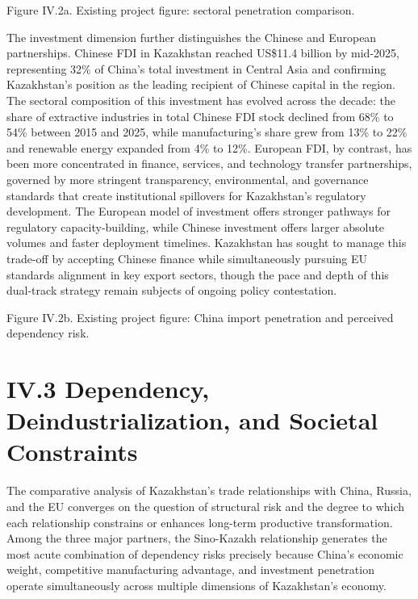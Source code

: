 \documentclass[12pt]{article}
\begin{document}
Figure IV.2a. Existing project figure: sectoral penetration comparison.\par
The investment dimension further distinguishes the Chinese and European partnerships. Chinese FDI in Kazakhstan reached US\$11.4 billion by mid-2025, representing 32\% of China's total investment in Central Asia and confirming Kazakhstan's position as the leading recipient of Chinese capital in the region. The sectoral composition of this investment has evolved across the decade: the share of extractive industries in total Chinese FDI stock declined from 68\% to 54\% between 2015 and 2025, while manufacturing's share grew from 13\% to 22\% and renewable energy expanded from 4\% to 12\%. European FDI, by contrast, has been more concentrated in finance, services, and technology transfer partnerships, governed by more stringent transparency, environmental, and governance standards that create institutional spillovers for Kazakhstan's regulatory development. The European model of investment offers stronger pathways for regulatory capacity-building, while Chinese investment offers larger absolute volumes and faster deployment timelines. Kazakhstan has sought to manage this trade-off by accepting Chinese finance while simultaneously pursuing EU standards alignment in key export sectors, though the pace and depth of this dual-track strategy remain subjects of ongoing policy contestation.\par

Figure IV.2b. Existing project figure: China import penetration and perceived dependency risk.\par
\section{IV.3 Dependency, Deindustrialization, and Societal Constraints}

The comparative analysis of Kazakhstan's trade relationships with China, Russia, and the EU converges on the question of structural risk and the degree to which each relationship constrains or enhances long-term productive transformation. Among the three major partners, the Sino-Kazakh relationship generates the most acute combination of dependency risks precisely because China's economic weight, competitive manufacturing advantage, and investment penetration operate simultaneously across multiple dimensions of Kazakhstan's economy.\par
\end{document}
